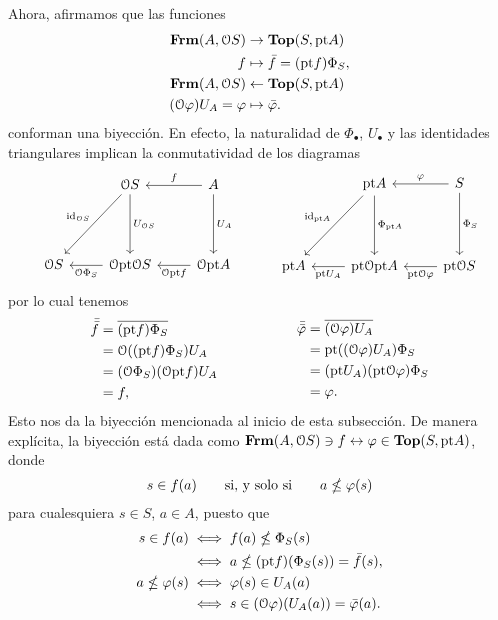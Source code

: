 \documentclass{comunicaciones}
\begin{document}
Ahora, afirmamos que las funciones
\begin{align*}
    \mathbf{Frm}(A,\mathcal{O}S) &\to \mathbf{Top}(S,\mathrm{pt} A) \\
    f &\mapsto \bar f = (\mathrm{pt} f)\Phi_S,
    \\
    \mathbf{Frm}(A,\mathcal{O}S) &\leftarrow \mathbf{Top}(S,\mathrm{pt} A) \\
    (\mathcal{O}\varphi)U_A = \varphi &\mapsto \bar{\varphi}.
\end{align*}
conforman una biyección. En efecto,
la naturalidad de $\Phi_\bullet$, $U_\bullet$ y las identidades
triangulares implican la conmutatividad de los diagramas
\[
    \begin{tikzcd}[row sep=15mm]
        & \Cal OS \ar[d,"U_{\Cal OS}"] \ar[dl,"\id_{\Cal OS}"']
        & A \ar[l,"f"'] \ar[d,"U_A"]
        \\
        \Cal OS
        & \Cal O\pt\Cal OS \ar[l,"\Cal O\Phi_S"]
        & \Cal O\pt A \ar[l,"\Cal O\pt f"]
    \end{tikzcd}
    \hspace{10mm}
    \begin{tikzcd}[row sep=15mm]
        & \pt A \ar[d,"\Phi_{\pt A}"] \ar[dl,"\id_{\pt A}"']
        & S \ar[l,"\phi"'] \ar[d,"\Phi_S"]
        \\
        \pt A
        & \pt \Cal O\pt A \ar[l,"\pt U_A"]
        & \pt \Cal OS \ar[l,"\pt\Cal O\phi"]
    \end{tikzcd}
\]
por lo cual tenemos
\[
    \begin{aligned}
        \bar{\bar f}
        &= \ol{(\pt f)\Phi_S} \\
        &= \Cal O((\pt f)\Phi_S)U_A \\
        &= (\Cal O\Phi_S)(\Cal O\pt f)U_A \\
        &= f,
    \end{aligned}
    \hspace{20mm}
    \begin{aligned}
        \bar{\bar\phi}
        &= \ol{(\Cal O\phi)U_A} \\
        &= \pt((\Cal O\phi)U_A)\Phi_S \\
        &= (\pt U_A)(\pt\Cal O\phi)\Phi_S \\
        &= \phi.
    \end{aligned}
\]
Esto nos da la biyección mencionada al inicio de esta subsección.
De manera explícita, la biyección está dada como
$\mathbf{Frm}(A,\mathcal{O}S)\ni f\leftrightarrow \varphi\in \mathbf{Top}(S,\mathrm{pt} A)$, donde
\[
    s\in f(a) \qquad\text{si, y solo si}\qquad a\nleq \varphi(s)
\]
para cualesquiera $s\in S$, $a\in A$, puesto que
\begin{align*}
    s\in f(a)
    &\iff f(a)\nleq \Phi_S(s) \\
    &\iff a \nleq (\mathrm{pt} f)(\Phi_S(s))=\bar f(s),
    \\
    a\nleq \varphi(s)
    &\iff \varphi(s) \in U_A(a) \\
    &\iff s \in (\mathcal{O}\varphi)(U_A(a)) = \bar{\varphi}(a).
\end{align*}
\end{document}
